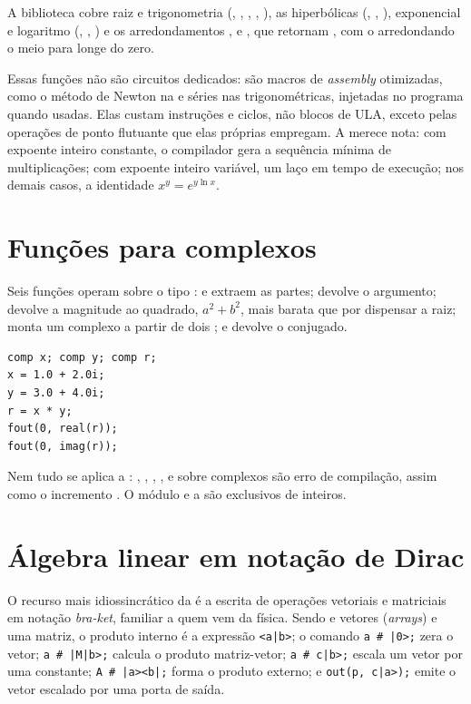 A biblioteca cobre raiz e trigonometria (, , , , ), as hiperbólicas (, , ), exponencial e logaritmo (, , ) e os arredondamentos ,  e , que retornam , com o  arredondando o meio para longe do zero.

Essas funções não são circuitos dedicados: são macros de \textit{assembly} otimizadas, como o método de Newton na  e séries nas trigonométricas, injetadas no programa quando usadas. Elas custam instruções e ciclos, não blocos de ULA, exceto pelas operações de ponto flutuante que elas próprias empregam. A  merece nota: com expoente inteiro constante, o compilador gera a sequência mínima de multiplicações; com expoente inteiro variável, um laço em tempo de execução; nos demais casos, a identidade $x^y = e^{y \ln x}$.

\section{Funções para complexos}

Seis funções operam sobre o tipo :  e  extraem as partes;  devolve o argumento;  devolve a magnitude ao quadrado, $a^2+b^2$, mais barata que  por dispensar a raiz;  monta um complexo a partir de dois ; e  devolve o conjugado.

\begin{lstlisting}[style=cmm]
comp x; comp y; comp r;
x = 1.0 + 2.0i;
y = 3.0 + 4.0i;
r = x * y;
fout(0, real(r));
fout(0, imag(r));
\end{lstlisting}

\begin{aviso}
Nem tudo se aplica a : , , , ,  e  sobre complexos são erro de compilação, assim como o incremento . O módulo \code{\%} e a  são exclusivos de inteiros.
\end{aviso}

\section{Álgebra linear em notação de Dirac}
\label{sec:dirac}

O recurso mais idiossincrático da \cmm{} é a escrita de operações vetoriais e matriciais em notação \textit{bra-ket}, familiar a quem vem da física. Sendo  e  vetores (\textit{arrays}) e  uma matriz, o produto interno é a expressão \texttt{<a|b>}; o comando \texttt{a \# |0>;} zera o vetor; \texttt{a \# |M|b>;} calcula o produto matriz-vetor; \texttt{a \# c|b>;} escala um vetor por uma constante; \texttt{A \# |a><b|;} forma o produto externo; e \texttt{out(p, c|a>);} emite o vetor escalado por uma porta de saída.

